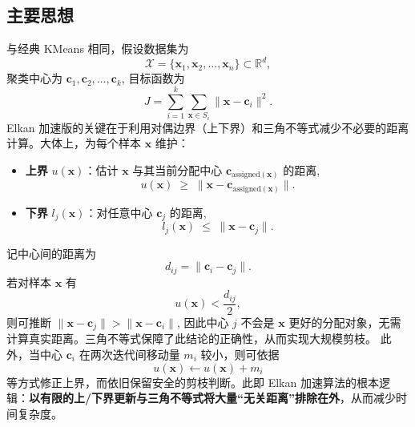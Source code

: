 \documentclass[12pt]{article}  %
\begin{document}
\subsection{主要思想}
与经典 KMeans 相同，假设数据集为
\[
  \mathcal{X} 
  = \{\mathbf{x}_1, \mathbf{x}_2, \dots, \mathbf{x}_n\} 
  \subset \mathbb{R}^d,
\]
聚类中心为 
\(\boldsymbol{c}_1, \boldsymbol{c}_2, \ldots, \boldsymbol{c}_k\),
目标函数为
\[
  J 
  = \sum_{i=1}^k 
  \sum_{\mathbf{x} \in S_i}
  \|\mathbf{x} - \boldsymbol{c}_i\|^2.
\]
Elkan 加速版的关键在于利用对偶边界（上下界）和三角不等式减少不必要的距离计算。大体上，为每个样本 $\mathbf{x}$ 维护：

\begin{itemize}
    \item \textbf{上界} $u(\mathbf{x})$：估计 $\mathbf{x}$ 与其当前分配中心 $\boldsymbol{c}_{\mathrm{assigned}(\mathbf{x})}$ 的距离,
    \[
      u(\mathbf{x}) 
      \;\ge\; 
      \|\mathbf{x} - \boldsymbol{c}_{\mathrm{assigned}(\mathbf{x})}\|.
    \]
    \item \textbf{下界} $l_j(\mathbf{x})$：对任意中心 $\boldsymbol{c}_j$ 的距离,
    \[
      l_j(\mathbf{x}) 
      \;\le\; 
      \|\mathbf{x} - \boldsymbol{c}_j\|.
    \]
\end{itemize}

记中心间的距离为
\[
  d_{ij} 
  = \|\boldsymbol{c}_i - \boldsymbol{c}_j\|.
\]
若对样本 $\mathbf{x}$ 有
\[
  u(\mathbf{x}) 
  < 
  \frac{d_{ij}}{2},
\]
则可推断
\(\|\mathbf{x} - \boldsymbol{c}_j\| 
> 
\|\mathbf{x} - \boldsymbol{c}_i\|\),
因此中心 $j$ 不会是 $\mathbf{x}$ 更好的分配对象，无需计算真实距离。三角不等式保障了此结论的正确性，从而实现大规模剪枝。  
此外，当中心 $\boldsymbol{c}_i$ 在两次迭代间移动量 $m_i$ 较小，则可依据
\[
  u(\mathbf{x}) 
  \leftarrow 
  u(\mathbf{x}) + m_i
\]
等方式修正上界，而依旧保留安全的剪枝判断。此即 Elkan 加速算法的根本逻辑：\textbf{以有限的上/下界更新与三角不等式将大量“无关距离”排除在外}，从而减少时间复杂度。
\end{document}
